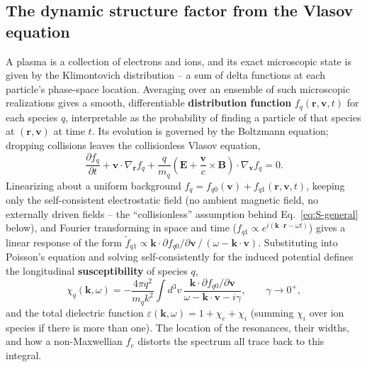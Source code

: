 \documentclass[11pt]{article}
\begin{document}
\subsection{The dynamic structure factor from the Vlasov equation}\label{sec:vlasov}

A plasma is a collection of electrons and ions, and its exact microscopic state is given by
the Klimontovich distribution -- a sum of delta functions at each particle's phase-space
location. Averaging over an ensemble of such microscopic realizations gives a smooth,
differentiable \textbf{distribution function} $f_q(\mathbf r,\mathbf v,t)$ for each species
$q$, interpretable as the probability of finding a particle of that species at
$(\mathbf r,\mathbf v)$ at time $t$. Its evolution is governed by the Boltzmann equation;
dropping collisions leaves the collisionless Vlasov equation,
\begin{equation}
  \frac{\partial f_q}{\partial t} + \mathbf v\cdot\nabla_{\mathbf r} f_q
  + \frac{q}{m_q}\left(\mathbf E + \frac{\mathbf v}{c}\times\mathbf B\right)\cdot\nabla_{\mathbf v} f_q = 0.
\end{equation}
Linearizing about a uniform background $f_q = f_{q0}(\mathbf v) + f_{q1}(\mathbf r,\mathbf
v,t)$, keeping only the self-consistent electrostatic field (no ambient magnetic field, no
externally driven fields -- the ``collisionless'' assumption behind
Eq.~\ref{eq:S-general} below), and Fourier transforming in space and time
($f_{q1}\propto e^{i(\mathbf k\cdot\mathbf r-\omega t)}$) gives a linear response of the
form $\tilde f_{q1} \propto \mathbf k\cdot\partial f_{q0}/\partial\mathbf v \,/\,(\omega -
\mathbf k\cdot\mathbf v)$. Substituting into Poisson's equation and solving self-consistently
for the induced potential defines the longitudinal \textbf{susceptibility} of species $q$,
\begin{equation}\label{eq:chi-def}
  \chi_q(\mathbf k,\omega) = -\frac{4\pi q^2}{m_q k^2}\int d^3v\,
  \frac{\mathbf k\cdot\partial f_{q0}/\partial \mathbf v}{\omega - \mathbf k\cdot\mathbf v - i\gamma},
  \qquad \gamma\to0^+,
\end{equation}
and the total dielectric function $\varepsilon(\mathbf k,\omega) = 1+\chi_e+\chi_i$
(summing $\chi_i$ over ion species if there is more than one). 
The location of the resonances, their widths, and how a non-Maxwellian $f_e$ distorts the
spectrum all trace back to this integral.
\end{document}
